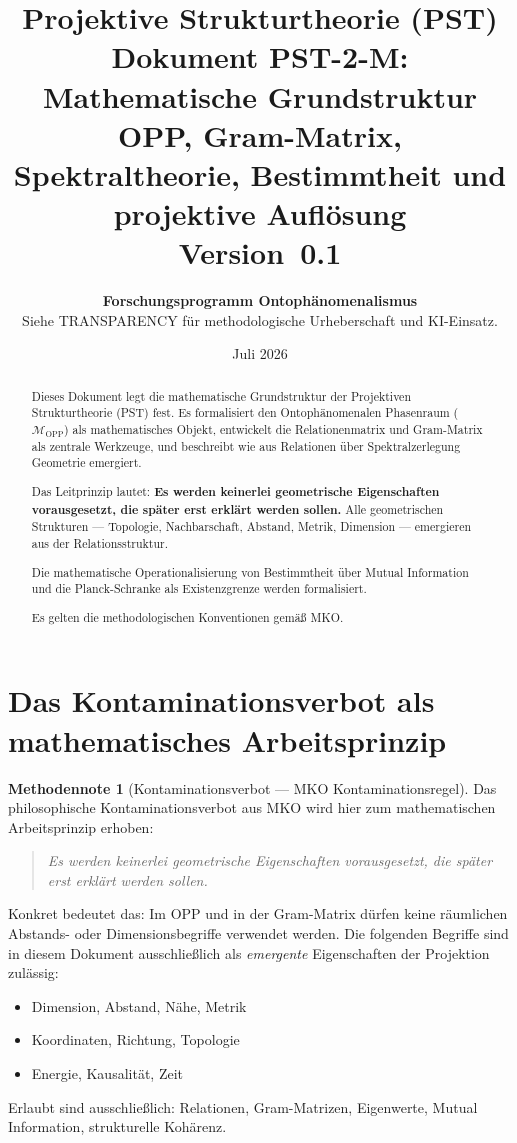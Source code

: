 \documentclass[11pt,a4paper]{article}
\title{
  \textbf{Projektive Strukturtheorie (PST)}\\[0.4em]
  \textbf{Dokument PST-2-M: Mathematische Grundstruktur}\\[0.4em]
  {\large OPP, Gram-Matrix, Spektraltheorie, Bestimmtheit
  und projektive Aufl\"{o}sung}\\[0.5em]
  {\normalsize Version~0.1}
}
\author{
  \textbf{Forschungsprogramm Ontoph\"{a}nomenalismus}\\
  \small Siehe TRANSPARENCY f\"{u}r methodologische Urheberschaft
  und KI-Einsatz.
}
\date{Juli 2026}
\theoremstyle{plain}
\theoremstyle{definition}
\newtheorem{methodennote}{Methodennote}[section]
\newcommand{\OPP}{\mathcal{M}_{\mathrm{OPP}}}
\begin{document}
\maketitle

\begin{abstract}
Dieses Dokument legt die mathematische Grundstruktur der Projektiven
Strukturtheorie (PST) fest. Es formalisiert den Ontoph\"{a}nomenalen
Phasenraum ($\OPP$) als mathematisches Objekt, entwickelt die
Relationenmatrix und Gram-Matrix als zentrale Werkzeuge, und beschreibt
wie aus Relationen \"{u}ber Spektralzerlegung Geometrie emergiert.

Das Leitprinzip lautet: \textbf{Es werden keinerlei geometrische
Eigenschaften vorausgesetzt, die sp\"{a}ter erst erkl\"{a}rt werden sollen.}
Alle geometrischen Strukturen --- Topologie, Nachbarschaft, Abstand, Metrik,
Dimension --- emergieren aus der Relationsstruktur.

Die mathematische Operationalisierung von Bestimmtheit \"{u}ber Mutual
Information und die Planck-Schranke als Existenzgrenze werden formalisiert.

Es gelten die methodologischen Konventionen gem\"{a}\ss{} MKO.
\end{abstract}

\tableofcontents
\newpage

\section{Das Kontaminationsverbot als mathematisches Arbeitsprinzip}

\begin{methodennote}[Kontaminationsverbot --- MKO Kontaminationsregel]
Das philosophische Kontaminationsverbot aus MKO wird hier zum
mathematischen Arbeitsprinzip erhoben:

\begin{quote}
\emph{Es werden keinerlei geometrische Eigenschaften vorausgesetzt,
die sp\"{a}ter erst erkl\"{a}rt werden sollen.}
\end{quote}

Konkret bedeutet das: Im OPP und in der Gram-Matrix d\"{u}rfen keine
r\"{a}umlichen Abstands- oder Dimensionsbegriffe verwendet werden.
Die folgenden Begriffe sind in diesem Dokument ausschlie\ss{}lich als
\emph{emergente} Eigenschaften der Projektion zul\"{a}ssig:
\begin{itemize}
  \item Dimension, Abstand, N\"{a}he, Metrik
  \item Koordinaten, Richtung, Topologie
  \item Energie, Kausalit\"{a}t, Zeit
\end{itemize}
Erlaubt sind ausschlie\ss{}lich: Relationen, Gram-Matrizen, Eigenwerte,
Mutual Information, strukturelle Koh\"{a}renz.
\end{methodennote}
\end{document}
